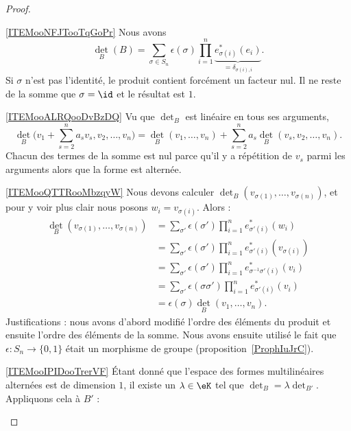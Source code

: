 \begin{proof}
\begin{subproof}
		\item[\ref{ITEMooNFJTooTqGoPr}]
		Nous avons
		\begin{equation}
			\det_B(B)=\sum_{\sigma\in S_n}\epsilon(\sigma)\prod_{i=1}^n\underbrace{e_{\sigma(i)}^*(e_i)}_{=\delta_{\sigma(i),i}}.
		\end{equation}
		Si \( \sigma\) n'est pas l'identité, le produit contient forcément un facteur nul. Il ne reste de la somme que \( \sigma=\id\) et le résultat est \( 1\).
		\item[\ref{ITEMooALRQooDvBzDQ}]
		Vu que \( \det_B\) est linéaire en tous ses arguments,
		\begin{equation}
			\det_B\big( v_1+\sum_{s=2}^na_sv_s,v_2,\ldots, v_n \big)=\det_B(v_1,\ldots, v_n)+\sum_{s=2}^na_s\det_B(v_s,v_2,\ldots, v_n).
		\end{equation}
		Chacun des termes de la somme est nul parce qu'il y a répétition de \( v_s\) parmi les arguments alors que la forme est alternée.
		\item[\ref{ITEMooQTTRooMbzqyW}]
		Nous devons calculer \( \det_B(v_{\sigma(1)},\ldots, v_{\sigma(n)})\), et pour y voir plus clair nous posons \( w_i=v_{\sigma(i)}\). Alors :
		\begin{subequations}
			\begin{align}
				\det_B(v_{\sigma(1)},\ldots, v_{\sigma(n)}) & =\sum_{\sigma'}\epsilon(\sigma')\prod_{i=1}^ne^*_{\sigma'(i)}(w_i)            \\
				                                            & =\sum_{\sigma'}\epsilon(\sigma')\prod_{i=1}^ne^*_{\sigma'(i)}(v_{\sigma(i)})  \\
				                                            & =\sum_{\sigma'}\epsilon(\sigma')\prod_{i=1}^ne^*_{\sigma^{-1}\sigma'(i)}(v_i) \\
				                                            & =\sum_{\sigma'}\epsilon(\sigma\sigma')\prod_{i=1}^ne^*_{\sigma'(i)}(v_i)      \\
				                                            & =\epsilon(\sigma)\det_B(v_1,\ldots, v_n).
			\end{align}
		\end{subequations}
		Justifications : nous avons d'abord modifié l'ordre des éléments du produit et ensuite l'ordre des éléments de la somme. Nous avons ensuite utilisé le fait que \( \epsilon\colon S_n\to \{ 0,1 \}\) était un morphisme de groupe (proposition~\ref{ProphIuJrC}).
		\item[\ref{ITEMooIPIDooTrerVF}]
		Étant donné que l'espace des formes multilinéaires alternées est de dimension \( 1\), il existe un \( \lambda\in \eK\) tel que \( \det_B=\lambda\det_{B'}\). Appliquons cela à \( B'\) :

\end{subproof}
\end{proof}
